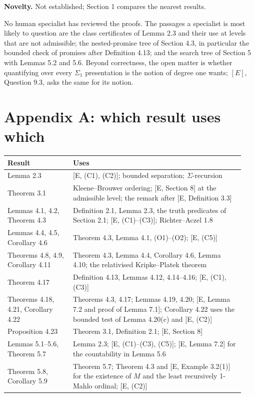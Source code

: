 \documentclass[11pt]{article}
\begin{document}
\textbf{Novelty.} Not established; Section 1 compares the nearest results.

No human specialist has reviewed the proofs. The passages a specialist is most likely to question are the class
certificates of Lemma 2.3 and their use at levels that are not admissible; the nested-promise tree of Section 4.3, in
particular the bounded check of promises after Definition 4.13; and the search tree of Section 5 with Lemmas 5.2 and
5.6. Beyond correctness, the open matter is whether quantifying over every $\Sigma_1$ presentation is the notion of
degree one wants; $[E]$, Question 9.3, asks the same for its notion.

\section*{Appendix A: which result uses which}

\begin{center}\begin{tabular}{p{0.26\linewidth}p{0.68\linewidth}}
\toprule
Result & Uses \\
\midrule
Lemma 2.3 & [E, (C1), (C2)]; bounded separation; $\Sigma$-recursion \\
Theorem 3.1 & Kleene--Brouwer ordering; [E, Section 8] at the admissible level; the remark after [E, Definition 3.3] \\
Lemmas 4.1, 4.2, Theorem 4.3 & Definition 2.1, Lemma 2.3, the truth predicates of Section 2.1; [E, (C1)--(C3)];
  Richter--Aczel 1.8 \\
Lemmas 4.4, 4.5, Corollary 4.6 & Theorem 4.3, Lemma 4.1, (O1)--(O2); [E, (C5)] \\
Theorems 4.8, 4.9, Corollary 4.11 & Theorem 4.3, Lemma 4.4, Corollary 4.6, Lemma 4.10; the relativised Kripke--Platek
  theorem \\
Theorem 4.17 & Definition 4.13, Lemmas 4.12, 4.14--4.16; [E, (C1), (C3)] \\
Theorems 4.18, 4.21, Corollary 4.22 & Theorems 4.3, 4.17; Lemmas 4.19, 4.20; [E, Lemma 7.2 and proof of Lemma 7.1];
  Corollary 4.22 uses the bounded test of Lemma 4.20(c) and [E, (C2)] \\
Proposition 4.23 & Theorem 3.1, Definition 2.1; [E, Section 8] \\
Lemmas 5.1--5.6, Theorem 5.7 & Lemma 2.3; [E, (C1)--(C3), (C5)]; [E, Lemma 7.2] for the countability in Lemma 5.6 \\
Theorem 5.8, Corollary 5.9 & Theorem 5.7; Theorem 4.3 and [E, Example 3.2(1)] for the existence of $M$ and the least recursively 1-Mahlo ordinal; [E,
  (C2)] \\
\bottomrule
\end{tabular}\end{center}
\end{document}

